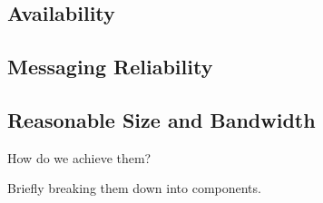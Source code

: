  \subsection{Availability}

 \subsection{Messaging Reliability}

 \subsection{Reasonable Size and Bandwidth}

 How do we achieve them?

 Briefly breaking them down into components.
